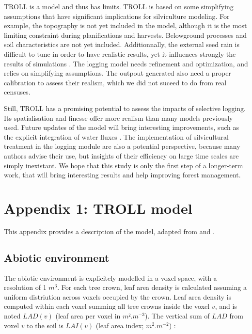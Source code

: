 \documentclass[12pt,]{article}
\let\oldsection\section
\renewcommand\section{\newpage\oldsection}
\theoremstyle{definition}
\theoremstyle{definition}
\theoremstyle{definition}
\theoremstyle{remark}
\begin{document}
TROLL is a model and thus has limits. TROLL is based on some simplifying
assumptions that have significant implications for silviculture
modeling. For example, the topography is not yet included in the model,
although it is the most limiting constraint during planifications and
harvests. Belowground processes and soil characteristics are not yet
included. Additionnally, the external seed rain is difficult to tune in
order to have realistic results, yet it influences strongly the results
of simulations \citep{Schmitt2017}. The logging model needs refinement
and optimization, and relies on simplifying assumptions. The outpout
generated also need a proper calibration to assess their realism, which
we did not suceed to do from real censuses.

Still, TROLL has a promising potential to assess the impacts of
selective logging. Its spatialisation and finesse offer more realism
than many models previously used. Future updates of the model will bring
interesting improvements, such as the explicit integration of water
fluxes \citep{Marechaux2017}. The implementation of silvicultural
treatment in the logging module are also a potential perspective,
because many authors advise their use, but insights of their efficiency
on large time scales are simply inexistant. We hope that this study is
only the first step of a longer-term work, that will bring interesting
results and help improving forest management.

\appendix


\section{Appendix 1: TROLL model}\label{appendix-1-troll-model}

This appendix provides a description of the model, adapted from
\citet{Marechaux2017} and \citet{Schmitt2017}.

\subsection{Abiotic environment}\label{abiotic-environment}

The abiotic environment is explicitely modelled in a voxel space, with a
resolution of 1 \(m^3\). For each tree crown, leaf area density is
calculated assuming a uniform distriution across voxels occupied by the
crown. Leaf area density is computed within each voxel summing all tree
crowns inside the voxel \(v\), and is noted \(LAD(v)\) (leaf area per
voxel in \(m².m^{-3}\)). The vertical sum of \(LAD\) from voxel \(v\) to
the soil is \(LAI(v)\) (leaf area index; \(m^2.m^{-2}\)) :
\end{document}
